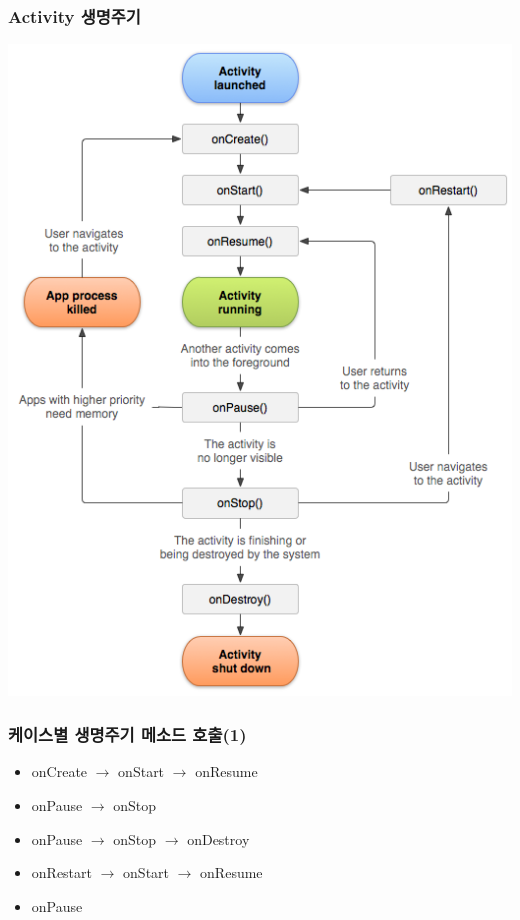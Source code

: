 \documentclass{beamer}
\begin{document}
\begin{frame}
\frametitle{Activity 생명주기}
\includegraphics[scale=0.3]{activity-lifecycle}
\end{frame}

\begin{frame}
\frametitle{케이스별 생명주기 메소드 호출(1)}
\begin{itemize}
\item {}
onCreate $\rightarrow$ onStart $\rightarrow$ onResume\\

\item {}
onPause $\rightarrow$ onStop\\
\item {}
onPause $\rightarrow$ onStop $\rightarrow$ onDestroy\\

\item {}
onRestart $\rightarrow$ onStart $\rightarrow$ onResume\\

\item {}\newline {}
onPause
\end{itemize}
\end{frame}
\end{document}
